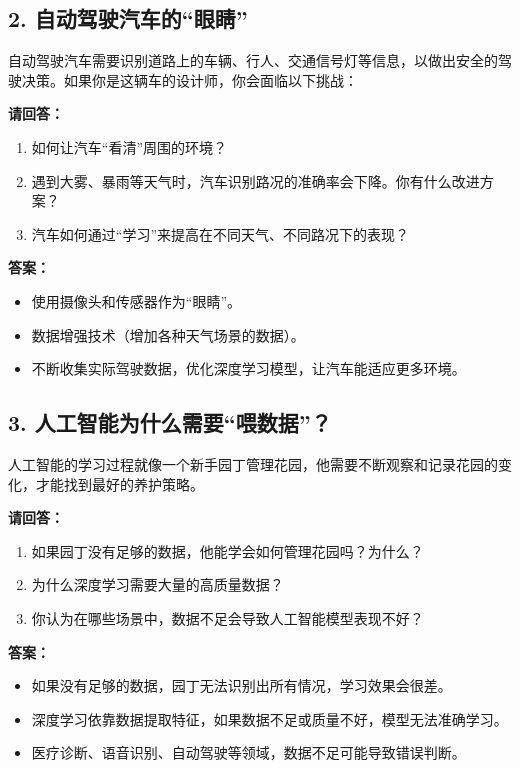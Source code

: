 \subsection*{2. 自动驾驶汽车的“眼睛”}
自动驾驶汽车需要识别道路上的车辆、行人、交通信号灯等信息，以做出安全的驾驶决策。如果你是这辆车的设计师，你会面临以下挑战：

\textbf{请回答：}
\begin{enumerate}
    \item 如何让汽车“看清”周围的环境？
    \item 遇到大雾、暴雨等天气时，汽车识别路况的准确率会下降。你有什么改进方案？
    \item 汽车如何通过“学习”来提高在不同天气、不同路况下的表现？
\end{enumerate}

\textbf{答案：}
\begin{itemize}
    \item 使用摄像头和传感器作为“眼睛”。
    \item 数据增强技术（增加各种天气场景的数据）。
    \item 不断收集实际驾驶数据，优化深度学习模型，让汽车能适应更多环境。
\end{itemize}

\subsection*{3. 人工智能为什么需要“喂数据”？}
人工智能的学习过程就像一个新手园丁管理花园，他需要不断观察和记录花园的变化，才能找到最好的养护策略。

\textbf{请回答：}
\begin{enumerate}
    \item 如果园丁没有足够的数据，他能学会如何管理花园吗？为什么？
    \item 为什么深度学习需要大量的高质量数据？
    \item 你认为在哪些场景中，数据不足会导致人工智能模型表现不好？
\end{enumerate}

\textbf{答案：}
\begin{itemize}
    \item 如果没有足够的数据，园丁无法识别出所有情况，学习效果会很差。
    \item 深度学习依靠数据提取特征，如果数据不足或质量不好，模型无法准确学习。
    \item 医疗诊断、语音识别、自动驾驶等领域，数据不足可能导致错误判断。
\end{itemize}

